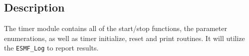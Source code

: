 \subsection{Description}

The timer module contains all of the start/stop functions, the 
parameter enumerations, as well as timer initialize, reset and  print routines.
It will utilize the {\tt ESMF\_Log} to report results.







